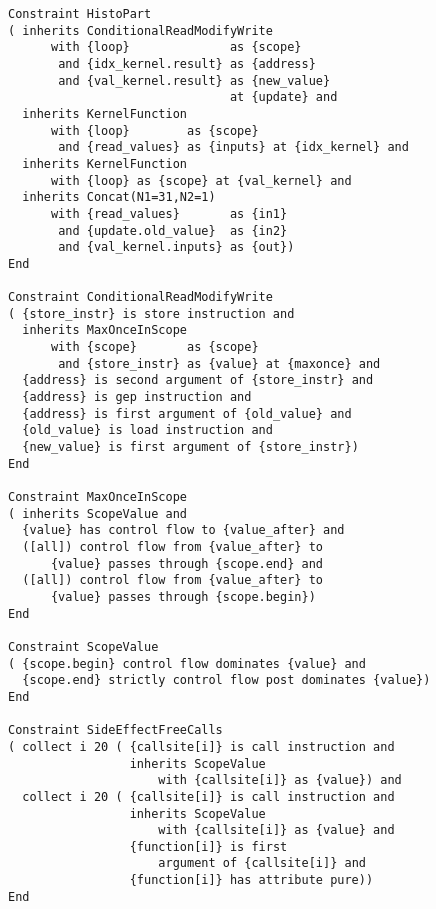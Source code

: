 \begin{figure}[p]
\begin{lstlisting}[language=IDL, firstnumber=85]
Constraint HistoPart
( inherits ConditionalReadModifyWrite
      with {loop}              as {scope}
       and {idx_kernel.result} as {address}
       and {val_kernel.result} as {new_value}
                               at {update} and
  inherits KernelFunction
      with {loop}        as {scope}
       and {read_values} as {inputs} at {idx_kernel} and
  inherits KernelFunction
      with {loop} as {scope} at {val_kernel} and
  inherits Concat(N1=31,N2=1)
      with {read_values}       as {in1}
       and {update.old_value}  as {in2}
       and {val_kernel.inputs} as {out})
End

Constraint ConditionalReadModifyWrite
( {store_instr} is store instruction and
  inherits MaxOnceInScope
      with {scope}       as {scope}
       and {store_instr} as {value} at {maxonce} and
  {address} is second argument of {store_instr} and
  {address} is gep instruction and
  {address} is first argument of {old_value} and
  {old_value} is load instruction and
  {new_value} is first argument of {store_instr})
End

Constraint MaxOnceInScope
( inherits ScopeValue and
  {value} has control flow to {value_after} and
  ([all]) control flow from {value_after} to
      {value} passes through {scope.end} and
  ([all]) control flow from {value_after} to
      {value} passes through {scope.begin})
End

Constraint ScopeValue
( {scope.begin} control flow dominates {value} and
  {scope.end} strictly control flow post dominates {value})
End

Constraint SideEffectFreeCalls
( collect i 20 ( {callsite[i]} is call instruction and
                 inherits ScopeValue
                     with {callsite[i]} as {value}) and
  collect i 20 ( {callsite[i]} is call instruction and
                 inherits ScopeValue
                     with {callsite[i]} as {value} and
                 {function[i]} is first
                     argument of {callsite[i]} and
                 {function[i]} has attribute pure))
End
\end{lstlisting}
\end{figure}
